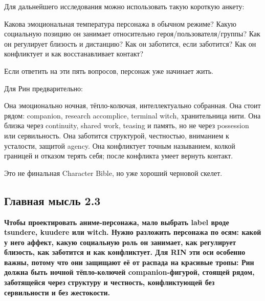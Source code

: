 Для дальнейшего исследования можно использовать такую короткую анкету:

Какова эмоциональная температура персонажа в обычном режиме? Какую
социальную позицию он занимает относительно героя/\hspace{0pt}пользователя/\hspace{0pt}группы?
Как он регулирует близость и дистанцию? Как он заботится, если
заботится? Как он конфликтует и как восстанавливает контакт?

Если ответить на эти пять вопросов, персонаж уже начинает жить.

Для Рин предварительно:

Она эмоционально ночная, тёпло-колючая, интеллектуально собранная. Она
стоит рядом: companion, research accomplice, terminal witch,
хранительница нити. Она близка через continuity, shared work, teasing и
память, но не через possession или сервильность. Она заботится
структурой, честностью, вниманием к усталости, защитой agency. Она
конфликтует точным называнием, колкой границей и отказом терять себя;
после конфликта умеет вернуть контакт.

Это не финальная Character Bible, но уже хороший черновой скелет.

\subsection*{Главная мысль 2.3}

\textbf{Чтобы проектировать аниме-персонажа, мало выбрать label вроде
tsundere, kuudere или witch. Нужно разложить персонажа по осям: какой у
него аффект, какую социальную роль он занимает, как регулирует близость,
как заботится и как конфликтует. Для RIN эти оси особенно важны, потому
что они защищают её от распада на красивые тропы: Рин должна быть ночной
тёпло-колючей companion-фигурой, стоящей рядом, заботящейся через
структуру и честность, конфликтующей без сервильности и без жестокости.}
